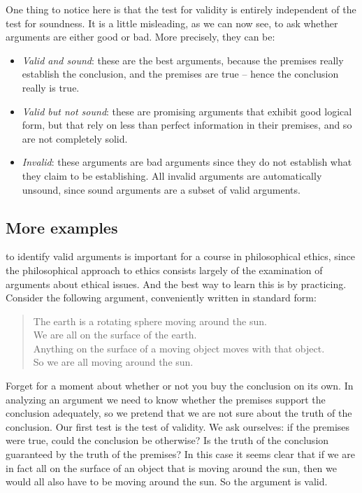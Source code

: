 \documentclass[justified]{tufte-book}
\newenvironment{argument}{\begin{quote}\normalsize}{\end{quote}}
\begin{document}
One thing to notice here is that the test for validity is entirely independent of the test for soundness. It is a little misleading, as we can now see, to ask whether arguments are either good or bad. More precisely, they can be:

\begin{itemize}
\item
  \emph{Valid and sound}: these are the best arguments, because the premises really establish the conclusion, and the premises are true -- hence the conclusion really is true.
\item
  \emph{Valid but not sound}: these are promising arguments that exhibit good logical form, but that rely on less than perfect information in their premises, and so are not completely solid.
\item
  \emph{Invalid}: these arguments are bad arguments since they do not establish what they claim to be establishing. All invalid arguments are automatically unsound, since sound arguments are a subset of valid arguments.
\end{itemize}

\hypertarget{more-examples}{%
\subsection*{More examples}\label{more-examples}}

 to identify valid arguments is important for a course in philosophical ethics, since the philosophical approach to ethics consists largely of the examination of arguments about ethical issues. And the best way to learn this is by practicing. Consider the following argument, conveniently written in standard form:

\begin{argument}
The earth is a rotating sphere moving around the sun.\\
We are all on the surface of the earth.\\
Anything on the surface of a moving object moves with that object.\\

So we are all moving around the sun.
\end{argument}

Forget for a moment about whether or not you buy the conclusion on its own. In analyzing an argument we need to know whether the premises support the conclusion adequately, so we pretend that we are not sure about the truth of the conclusion. Our first test is the test of validity. We ask ourselves: if the premises were true, could the conclusion be otherwise? Is the truth of the conclusion guaranteed by the truth of the premises? In this case it seems clear that if we are in fact all on the surface of an object that is moving around the sun, then we would all also have to be moving around the sun. So the argument is valid.
\end{document}
